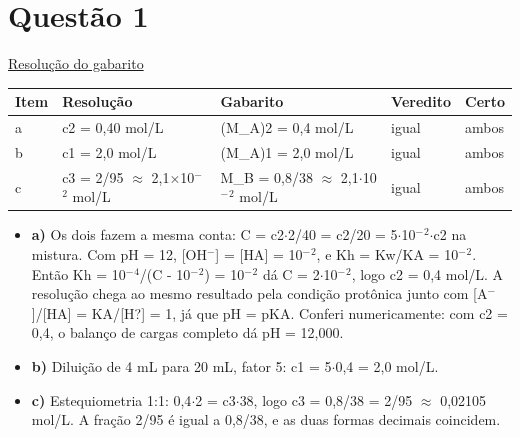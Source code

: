 \documentclass{article}%
\begin{document}
\section*{Questão 1}%
\href{https://poliedroresolve.sistemapoliedro.com.br/vestibulares/ita/2026/ita-2-fase-dia-2-29-10-2025-2-fase-dia-2/dissertativa-1-quimica-2-fase-dia-2-ita-2026}{Resolução do gabarito}\par\smallskip%
\begin{longtable}{@{}p{} p{} p{} p{} p{}@{}}\toprule Item & Resolução & Gabarito & Veredito & Certo \\ \midrule
a & c2 = 0,40 mol/L & (M\_A)2 = 0,4 mol/L & igual & ambos \\
b & c1 = 2,0 mol/L & (M\_A)1 = 2,0 mol/L & igual & ambos \\
c & c3 = 2/95 $\approx$ 2,1$\times$10$^{-}$$^2$ mol/L & M\_B = 0,8/38 $\approx$ 2,1$\cdot$10$^{-}$$^2$ mol/L & igual & ambos \\
\bottomrule\end{longtable}%
\begin{itemize}%
\item%
\textbf{a)} Os dois fazem a mesma conta: C = c2$\cdot$2/40 = c2/20 = 5$\cdot$10$^{-}$$^2$$\cdot$c2 na mistura. Com pH = 12, {[}OH$^{-}${]} = {[}HA{]} = 10$^{-}$$^2$, e Kh = Kw/KA = 10$^{-}$$^2$. Então Kh = 10$^{-}$$^{4}$/(C - 10$^{-}$$^2$) = 10$^{-}$$^2$ dá C = 2$\cdot$10$^{-}$$^2$, logo c2 = 0,4 mol/L. A resolução chega ao mesmo resultado pela condição protônica junto com {[}A$^{-}${]}/{[}HA{]} = KA/{[}H?{]} = 1, já que pH = pKA. Conferi numericamente: com c2 = 0,4, o balanço de cargas completo dá pH = 12,000.%
\item%
\textbf{b)} Diluição de 4 mL para 20 mL, fator 5: c1 = 5$\cdot$0,4 = 2,0 mol/L.%
\item%
\textbf{c)} Estequiometria 1:1: 0,4$\cdot$2 = c3$\cdot$38, logo c3 = 0,8/38 = 2/95 $\approx$ 0,02105 mol/L. A fração 2/95 é igual a 0,8/38, e as duas formas decimais coincidem.%
\end{itemize}%
\end{document}
